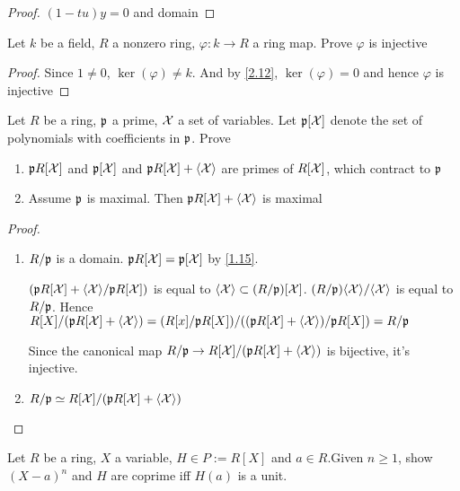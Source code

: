 \documentclass[11pt]{article}
\begin{document}
\begin{proof}
\((1-tu)y=0\) and domain
\end{proof}

\begin{exercise}
\label{2.31}
Let \(k\) be a field, \(R\) a nonzero ring, \(\varphi:k\to R\) a ring map. Prove \(\varphi\)
is injective
\end{exercise}

\begin{proof}
Since \(1\neq0\), \(\ker(\varphi)\neq k\). And by \ref{2.12}, \(\ker(\varphi)=0\) and hence
\(\varphi\) is injective
\end{proof}

\begin{exercise}
\label{2.32}
Let \(R\) be a ring, \(\mathfrak{p}\) a prime, \(\mathcal{X}\) a set of variables. Let
\(\mathfrak{p}[\mathcal{X}]\) denote the set of polynomials with coefficients in \(\mathfrak{p}\).
Prove
\begin{enumerate}
\item \(\mathfrak{p} R[\mathcal{X}]\) and \(\mathfrak{p}[\mathcal{X}]\) and \(\mathfrak{p} R[\mathcal{X}]+\langle\mathcal{X}\rangle\) are
primes of \(R[\mathcal{X}]\), which contract to \(\mathfrak{p}\)
\item Assume \(\mathfrak{p}\) is maximal. Then \(\mathfrak{p} R[\mathcal{X}]+\langle\mathcal{X}\rangle\) is maximal
\end{enumerate}
\end{exercise}

\begin{proof}
\begin{enumerate}
\item \(R/\mathfrak{p}\) is a domain. \(\mathfrak{p} R[\mathcal{X}]=\mathfrak{p}[\mathcal{X}]\) by \ref{1.15}.

\((\mathfrak{p} R[\mathcal{X}]+\langle\mathcal{X}\rangle/\mathfrak{p} R[\mathcal{X}])\) is equal to
\(\langle\mathcal{X}\rangle\subset(R/\mathfrak{p})[\mathcal{X}]\). \((R/\mathfrak{p})\langle\mathcal{X}\rangle/\langle\mathcal{X}\rangle\)
is equal to \(R/\mathfrak{p}\). Hence
\(R[X]/(\mathfrak{p} R[\mathcal{X}]+\langle\mathcal{X}\rangle)=(R[x]/\mathfrak{p} R[X])/((\mathfrak{p}
      R[\mathcal{X}]+\langle\mathcal{X}\rangle)/\mathfrak{p} R[X])=R/\mathfrak{p}\)

Since the canonical map \(R/\mathfrak{p}\to R[\mathcal{X}]/(\mathfrak{p} R[\mathcal{X}]+\langle\mathcal{X}\rangle)\)
is bijective, it's injective.

\item \(R/\mathfrak{p}\simeq R[\mathcal{X}]/(\mathfrak{p} R[\mathcal{X}]+\langle\mathcal{X}\rangle)\)
\end{enumerate}
\end{proof}

\begin{exercise}
\label{2.33}
Let \(R\) be a ring, \(X\) a variable, \(H\in P:=R[X]\) and \(a\in R.\)Given
\(n\ge1\), show \((X-a)^n\) and \(H\) are coprime iff \(H(a)\) is a unit.
\end{exercise}
\end{document}
